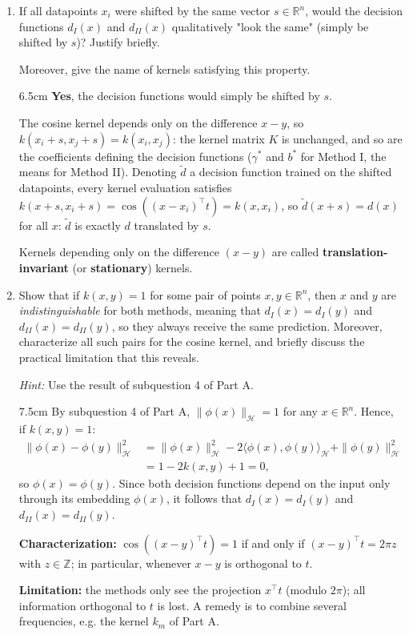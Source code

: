 \begin{enumerate}
    \item If all datapoints $x_i$ were shifted by the same vector $s\in \mathbb{R}^n$, would the decision functions $d_{I}(x)$ and $d_{II}(x)$ qualitatively "look the same" (simply be shifted by $s$)? Justify briefly.

    Moreover, give the name of kernels satisfying this property.
    \begin{solutionbox}{6.5cm}
    \textbf{Yes}, the decision functions would simply be shifted by $s$.

    The cosine kernel depends only on the difference $x-y$, so $k(x_i+s, x_j+s) = k(x_i, x_j)$: the kernel matrix $K$ is unchanged, and so are the coefficients defining the decision functions ($\gamma^*$ and $b^*$ for Method I, the means for Method II). Denoting $\tilde{d}$ a decision function trained on the shifted datapoints, every kernel evaluation satisfies $k(x+s, x_i+s) = \cos((x-x_i)^\top t) = k(x,x_i)$, so $\tilde{d}(x+s) = d(x)$ for all $x$: $\tilde{d}$ is exactly $d$ translated by $s$.

    Kernels depending only on the difference $(x-y)$ are called \textbf{translation-invariant} (or \textbf{stationary}) kernels.
    \end{solutionbox}
    \item Show that if $k(x,y) = 1$ for some pair of points $x, y \in \mathbb{R}^n$, then $x$ and $y$ are \textit{indistinguishable} for both methods, meaning that $d_I(x) = d_I(y)$ and $d_{II}(x) = d_{II}(y)$, so they always receive the same prediction. Moreover, characterize all such pairs for the cosine kernel, and briefly discuss the practical limitation that this reveals.

    \textit{Hint:} Use the result of subquestion 4 of Part A.
    \begin{solutionbox}{7.5cm}
    By subquestion 4 of Part A, $\|\phi(x)\|_{\mathcal{H}} = 1$ for any $x \in \mathbb{R}^n$. Hence, if $k(x,y) = 1$:
    \begin{align*}
    \|\phi(x) - \phi(y)\|_{\mathcal{H}}^2 &= \|\phi(x)\|_{\mathcal{H}}^2 - 2\langle \phi(x), \phi(y) \rangle_{\mathcal{H}} + \|\phi(y)\|_{\mathcal{H}}^2 \\
    &= 1 - 2k(x,y) + 1 = 0,
    \end{align*}
    so $\phi(x) = \phi(y)$. Since both decision functions depend on the input only through its embedding $\phi(x)$, it follows that $d_I(x) = d_I(y)$ and $d_{II}(x) = d_{II}(y)$.

    \textbf{Characterization:} $\cos((x-y)^\top t) = 1$ if and only if $(x-y)^\top t = 2\pi z$ with $z \in \mathbb{Z}$; in particular, whenever $x-y$ is orthogonal to $t$.

    \textbf{Limitation:} the methods only see the projection $x^\top t$ (modulo $2\pi$); all information orthogonal to $t$ is lost. A remedy is to combine several frequencies, e.g. the kernel $k_m$ of Part A.
    \end{solutionbox}
\end{enumerate}
\clearpage
